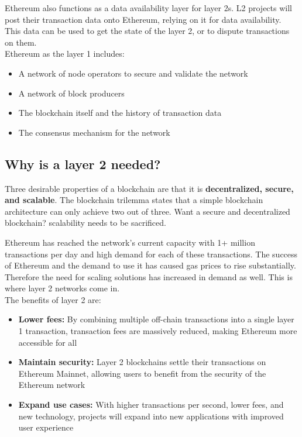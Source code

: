 \documentclass[MSE,Master,english]{twbook}%
\begin{document}
Ethereum also functions as a data availability layer for layer 2s. \ac{L2} projects will post their transaction data onto Ethereum, relying on it for data availability. This data can be used to get the state of the layer 2, or to dispute transactions on them. \\

Ethereum as the layer 1 includes:

\begin{itemize}
  \item A network of node operators to secure and validate the network
  \item A network of block producers
  \item The blockchain itself and the history of transaction data
  \item The consensus mechanism for the network
\end{itemize}

\subsection{Why is a layer 2 needed?}
Three desirable properties of a blockchain are that it is \textbf{decentralized, secure, and scalable}. The blockchain trilemma states that a simple blockchain architecture can only achieve two out of three. Want a secure and decentralized blockchain? scalability needs to be sacrificed.

Ethereum has reached the network's current capacity with 1+ million transactions per day and high demand for each of these transactions. The success of Ethereum and the demand to use it has caused gas prices to rise substantially. Therefore the need for scaling solutions has increased in demand as well. This is where layer 2 networks come in. \\

The benefits of layer 2 are:
\begin{itemize}
  \item \textbf{Lower fees:} By combining multiple off-chain transactions into a single layer 1 transaction, transaction fees are massively reduced, making Ethereum more accessible for all
  \item \textbf{Maintain security:} Layer 2 blockchains settle their transactions on Ethereum Mainnet, allowing users to benefit from the security of the Ethereum network
  \item \textbf{Expand use cases:} With higher transactions per second, lower fees, and new technology, projects will expand into new applications with improved user experience
\end{itemize}
\end{document}
